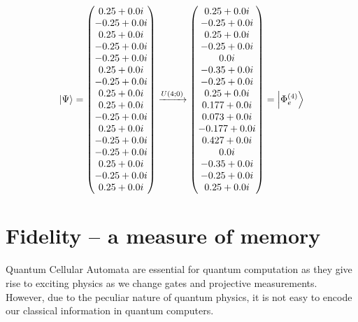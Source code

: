 \documentclass[11pt, oneside, listof=totoc]{scrbook}
\begin{document}
\begin{equation*}
    \ket{\Psi} = \mqty(
    0.25+0.0 i  \\
    -0.25+0.0 i \\
    0.25+0.0 i  \\
    -0.25+0.0 i \\
    -0.25+0.0 i \\
    0.25+0.0 i  \\
    -0.25+0.0 i \\
    0.25+0.0 i  \\
    0.25+0.0 i  \\
    -0.25+0.0 i \\
    0.25+0.0 i  \\
    -0.25+0.0 i \\
    -0.25+0.0 i \\
    0.25+0.0 i  \\
    -0.25+0.0 i \\
    0.25+0.0 i
    ) \xrightarrow{U(4; 0)}
    \mqty(
    0.25+0.0 i \\
    -0.25+0.0 i \\
    0.25+0.0 i \\
    -0.25+0.0 i \\
    0.0 i \\
    -0.35+0.0 i \\
    -0.25+0.0 i \\
    0.25+0.0 i \\
    0.177+0.0 i \\
    0.073+0.0 i \\
    -0.177+0.0 i \\
    0.427+0.0 i \\
    0.0 i \\
    -0.35+0.0 i \\
    -0.25+0.0 i \\
    0.25+0.0 i \\
    ) = \ket{\Phi_e^{(4)}}
\end{equation*}

\section{Fidelity -- a measure of memory}

Quantum Cellular Automata are essential for quantum computation as they give rise to exciting physics as we change gates and projective measurements. However, due to the peculiar nature of quantum physics, it is not easy to encode our classical information in quantum computers.
\end{document}
